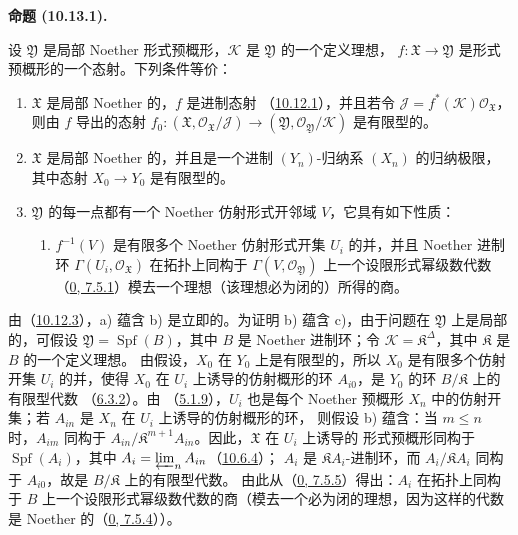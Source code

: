 \documentclass[UTF8,fontset=none,11pt,oneside,openany]{ctexbook}
\newenvironment{proposition}[1][]{%
  \par\medskip\noindent\textbf{命题 (#1).}\ %
}{\par}
\newcommand{\oldpage}[2][]{%
  \hypertarget{ega-source-page-#1-#2}{}%
  \marginnote{\scriptsize\textbf{#1}~|~#2}\ignorespaces}
\let\EGAOriginalLabel\label
\renewcommand{\label}[1]{\phantomsection\EGAOriginalLabel{#1}}
\begin{document}
\begin{proposition}[10.13.1]
\label{I.10.13.1-fr}
设 $\mathfrak{Y}$ 是局部 Noether 形式预概形，$\mathscr{K}$ 是
$\mathfrak{Y}$ 的一个定义理想，
$f:\mathfrak{X}\to\mathfrak{Y}$ 是形式预概形的一个态射。下列条件等价：
\begin{enumerate}
  \item[a)] $\mathfrak{X}$ 是局部 Noether 的，$f$ 是进制态射
    （\hyperref[I.10.12.1-fr]{10.12.1}），并且若令
    $\mathscr{J}=f^*(\mathscr{K})\mathscr{O}_{\mathfrak{X}}$，则由 $f$ 导出的态射
    $f_0:(\mathfrak{X},\mathscr{O}_{\mathfrak{X}}/\mathscr{J})
    \to(\mathfrak{Y},\mathscr{O}_{\mathfrak{Y}}/\mathscr{K})$ 是有限型的。
  \item[b)] $\mathfrak{X}$ 是局部 Noether 的，并且是一个进制
    $(Y_n)$-归纳系 $(X_n)$ 的归纳极限，其中态射 $X_0\to Y_0$ 是有限型的。

\oldpage[I]{208}

  \item[c)] $\mathfrak{Y}$ 的每一点都有一个 Noether 仿射形式开邻域
    $V$，它具有如下性质：
    \begin{enumerate}
      \item[(\textbf{Q})] $f^{-1}(V)$ 是有限多个 Noether 仿射形式开集
        $U_i$ 的并，并且 Noether 进制环
        $\Gamma(U_i,\mathscr{O}_{\mathfrak{X}})$ 在拓扑上同构于
        $\Gamma(V,\mathscr{O}_{\mathfrak{Y}})$ 上一个设限形式幂级数代数
        （\hyperref[0.7.5.1-fr]{0, 7.5.1}）模去一个理想（该理想必为闭的）所得的商。
    \end{enumerate}
\end{enumerate}
\end{proposition}

由（\hyperref[I.10.12.3-fr]{10.12.3}），a) 蕴含 b) 是立即的。为证明
b) 蕴含 c)，由于问题在 $\mathfrak{Y}$ 上是局部的，可假设
$\mathfrak{Y}=\operatorname{Spf}(B)$，其中 $B$ 是 Noether 进制环；令
$\mathscr{K}=\mathfrak{K}^\Delta$，其中 $\mathfrak{K}$ 是 $B$ 的一个定义理想。
由假设，$X_0$ 在 $Y_0$ 上是有限型的，所以 $X_0$ 是有限多个仿射开集
$U_i$ 的并，使得 $X_0$ 在 $U_i$ 上诱导的仿射概形的环 $A_{i0}$，是
$Y_0$ 的环 $B/\mathfrak{K}$ 上的有限型代数
（\hyperref[I.6.3.2-fr]{6.3.2}）。由
（\hyperref[I.5.1.9-fr]{5.1.9}），$U_i$ 也是每个 Noether 预概形
$X_n$ 中的仿射开集；若 $A_{in}$ 是 $X_n$ 在 $U_i$ 上诱导的仿射概形的环，
则假设 b) 蕴含：当 $m\leq n$ 时，$A_{im}$ 同构于
$A_{in}/\mathfrak{K}^{m+1}A_{in}$。因此，$\mathfrak{X}$ 在 $U_i$ 上诱导的
形式预概形同构于 $\operatorname{Spf}(A_i)$，其中
$A_i=\varprojlim_n A_{in}$（\hyperref[I.10.6.4-fr]{10.6.4}）；
$A_i$ 是 $\mathfrak{K}A_i$-进制环，而
$A_i/\mathfrak{K}A_i$ 同构于 $A_{i0}$，故是 $B/\mathfrak{K}$ 上的有限型代数。
由此从（\hyperref[0.7.5.5-fr]{0, 7.5.5}）得出：$A_i$ 在拓扑上同构于
$B$ 上一个设限形式幂级数代数的商（模去一个必为闭的理想，因为这样的代数是
Noether 的（\hyperref[0.7.5.4-fr]{0, 7.5.4}））。
\end{document}
